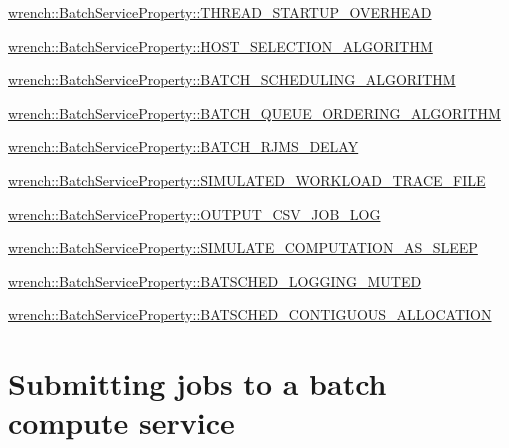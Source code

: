 \begin{DoxyItemize}
\item {\ttfamily \hyperlink{classwrench_1_1_batch_service_property_ad60a71526e251e20cbd871e5d30e5023}{wrench\+::\+Batch\+Service\+Property\+::\+T\+H\+R\+E\+A\+D\+\_\+\+S\+T\+A\+R\+T\+U\+P\+\_\+\+O\+V\+E\+R\+H\+E\+AD}}
\item {\ttfamily \hyperlink{classwrench_1_1_batch_service_property_af75bbbe70a733d3a65cddc5c57b0b441}{wrench\+::\+Batch\+Service\+Property\+::\+H\+O\+S\+T\+\_\+\+S\+E\+L\+E\+C\+T\+I\+O\+N\+\_\+\+A\+L\+G\+O\+R\+I\+T\+HM}}
\item {\ttfamily \hyperlink{classwrench_1_1_batch_service_property_aceb0af1c33f5ff2da347f54a484ce32e}{wrench\+::\+Batch\+Service\+Property\+::\+B\+A\+T\+C\+H\+\_\+\+S\+C\+H\+E\+D\+U\+L\+I\+N\+G\+\_\+\+A\+L\+G\+O\+R\+I\+T\+HM}}
\item {\ttfamily \hyperlink{classwrench_1_1_batch_service_property_a51cc79b2c963a67dac5685fbba4e5a9f}{wrench\+::\+Batch\+Service\+Property\+::\+B\+A\+T\+C\+H\+\_\+\+Q\+U\+E\+U\+E\+\_\+\+O\+R\+D\+E\+R\+I\+N\+G\+\_\+\+A\+L\+G\+O\+R\+I\+T\+HM}}
\item {\ttfamily \hyperlink{classwrench_1_1_batch_service_property_a685c9784445ed28adbe43f69ccb98249}{wrench\+::\+Batch\+Service\+Property\+::\+B\+A\+T\+C\+H\+\_\+\+R\+J\+M\+S\+\_\+\+D\+E\+L\+AY}}
\item {\ttfamily \hyperlink{classwrench_1_1_batch_service_property_a6a7fb4d9f505cc29f7236ea3e5713f34}{wrench\+::\+Batch\+Service\+Property\+::\+S\+I\+M\+U\+L\+A\+T\+E\+D\+\_\+\+W\+O\+R\+K\+L\+O\+A\+D\+\_\+\+T\+R\+A\+C\+E\+\_\+\+F\+I\+LE}}
\item {\ttfamily \hyperlink{classwrench_1_1_batch_service_property_a0757979b1512be80fda90cbab946b51f}{wrench\+::\+Batch\+Service\+Property\+::\+O\+U\+T\+P\+U\+T\+\_\+\+C\+S\+V\+\_\+\+J\+O\+B\+\_\+\+L\+OG}}
\item {\ttfamily \hyperlink{classwrench_1_1_batch_service_property_a0bde5c75f5f093ae15e68d67ae453ac3}{wrench\+::\+Batch\+Service\+Property\+::\+S\+I\+M\+U\+L\+A\+T\+E\+\_\+\+C\+O\+M\+P\+U\+T\+A\+T\+I\+O\+N\+\_\+\+A\+S\+\_\+\+S\+L\+E\+EP}}
\item {\ttfamily \hyperlink{classwrench_1_1_batch_service_property_aaab42384419440aacdbaac79e3346bf1}{wrench\+::\+Batch\+Service\+Property\+::\+B\+A\+T\+S\+C\+H\+E\+D\+\_\+\+L\+O\+G\+G\+I\+N\+G\+\_\+\+M\+U\+T\+ED}}
\item {\ttfamily \hyperlink{classwrench_1_1_batch_service_property_ac21c68a5a297ba00fc919cec0d90c18d}{wrench\+::\+Batch\+Service\+Property\+::\+B\+A\+T\+S\+C\+H\+E\+D\+\_\+\+C\+O\+N\+T\+I\+G\+U\+O\+U\+S\+\_\+\+A\+L\+L\+O\+C\+A\+T\+I\+ON}}
\end{DoxyItemize}\hypertarget{guide-batch_guide-batch-using}{}\section{Submitting jobs to a batch compute service}\label{guide-batch_guide-batch-using}
